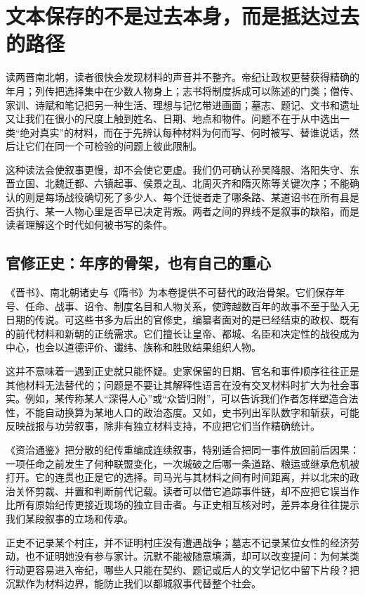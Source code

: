 \section{文本保存的不是过去本身，而是抵达过去的路径}
\label{sec:synthesis-texts-debates}

读两晋南北朝，读者很快会发现材料的声音并不整齐。帝纪让政权更替获得精确的年月；列传把选择集中在少数人物身上；志书将制度拆成可以陈述的门类；僧传、家训、诗赋和笔记把另一种生活、理想与记忆带进画面；墓志、题记、文书和遗址又让我们在很小的尺度上触到姓名、日期、地点和物件。问题不在于从中选出一类“绝对真实”的材料，而在于先辨认每种材料为何而写、何时被写、替谁说话，然后让它们在同一个可检验的问题上彼此限制。

这种读法会使叙事更慢，却不会使它更虚。我们仍可确认孙吴降服、洛阳失守、东晋立国、北魏迁都、六镇起事、侯景之乱、北周灭齐和隋灭陈等关键次序；不能确认的则是每场战役确切死了多少人、每个迁徙者走了哪条路、某道诏书在所有县是否执行、某一人物心里是否早已决定背叛。两者之间的界线不是叙事的缺陷，而是读者理解这个时代如何被书写的条件。

\subsection{官修正史：年序的骨架，也有自己的重心}

《晋书》、南北朝诸史与《隋书》为本卷提供不可替代的政治骨架。它们保存年号、任命、战事、诏令、制度名目和人物关系，使跨越数百年的故事不至于坠入无日期的传说。可这些书多为后出的官修史，编纂者面对的是已经结束的政权、既有的前代材料和新朝的正统需求。它们擅长让皇帝、都城、名臣和决定性的战役成为中心，也会以道德评价、谶纬、族称和胜败结果组织人物。

这并不意味着一遇到正史就只能怀疑。史家保留的日期、官名和事件顺序往往正是其他材料无法替代的；问题是不要让其解释性语言在没有交叉材料时扩大为社会事实。例如，某传称某人“深得人心”或“众皆归附”，可以告诉我们作者怎样塑造合法性，不能自动换算为某地人口的政治态度。又如，史书列出军队数字和斩获，可能反映战报与功劳叙事，除非有独立材料支持，不应把它们当作精确统计。

《资治通鉴》把分散的纪传重编成连续叙事，特别适合把同一事件放回前后因果：一项任命之前发生了何种联盟变化，一次城破之后哪一条道路、粮运或继承危机被打开。它的连贯也正是它的选择。司马光与其材料之间有时间距离，并以北宋的政治关怀剪裁、并置和判断前代记载。读者可以借它追踪事件链，却不应把它误当作比所有原始纪传更接近现场的独立目击者。与正史相互核对时，差异本身往往提示我们某段叙事的立场和传承。

\begin{sourcenote}[史书的沉默同样是一种信息]
正史不记录某个村庄，并不证明村庄没有遭遇战争；墓志不记录某位女性的经济劳动，也不证明她没有参与家计。沉默不能被随意填满，却可以改变提问：为何某类行动更容易进入帝纪，哪些人只能在契约、题记或后人的文学记忆中留下片段？把沉默作为材料边界，能防止我们以都城叙事代替整个社会。
\end{sourcenote}


